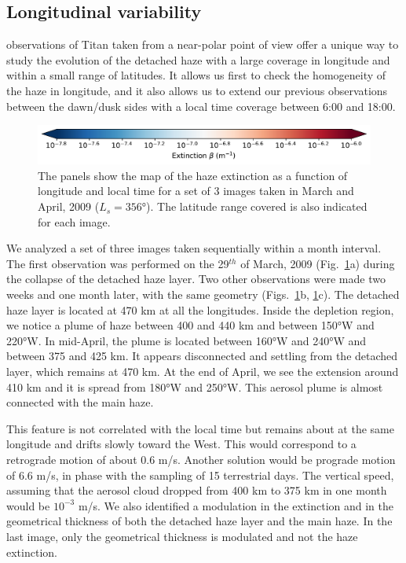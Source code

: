 \subsection{Longitudinal variability}

 observations of Titan taken from a near-polar point of view offer a unique way to study the evolution of
the detached haze with a large coverage in longitude and within a small range of latitudes. It allows us
first to check the homogeneity of the haze in longitude, and it also allows us to extend our previous
observations between the dawn/dusk sides with a local time coverage between 6:00 and 18:00.

\begin{figure}[!ht]
\includegraphics[width=.5\textwidth]{Fig/Extinction_colorbar}
\caption{The panels show the map of the haze extinction as a function of longitude and local
time for a set of 3 images taken in March and April, 2009 ($L_s=\ang{356}$). The latitude range covered is
also indicated for each image.}
\label{fig:lon_variability}
\end{figure}

We analyzed a set of three images taken sequentially within a month interval. The first observation
was performed on the 29$^{th}$ of March, 2009 (Fig.~\ref{fig:lon_variability}a) during the collapse of the detached
haze layer. Two other observations were made two weeks and one month later, with the same geometry
(Figs.~\ref{fig:lon_variability}b, \ref{fig:lon_variability}c). The detached haze layer is
located at 470 km at all the longitudes. Inside the depletion region, we notice a plume of haze
between 400 and 440 km and between \ang{150}W and \ang{220}W. In mid-April, the plume is located between
\ang{160}W and \ang{240}W and between 375 and 425 km. It appears disconnected and settling from the detached
layer, which remains at 470 km. At the end of April, we see the extension around 410 km and it
is spread from \ang{180}W and \ang{250}W. This aerosol plume is almost connected with the main haze.

This feature is not correlated with the local time but remains about at the same longitude and drifts slowly
toward the West. This would correspond to a retrograde motion of about 0.6 m/s. Another solution would be
prograde motion of 6.6 m/s, in phase with the sampling of 15 terrestrial days. The vertical speed, assuming
that the aerosol cloud dropped from 400 km to 375 km in one month would be $10^{-3}$ m/s. We also identified a
modulation in the extinction and in the geometrical thickness of both the detached haze layer and the main
haze. In the last image, only the geometrical thickness is modulated and not the haze extinction.

